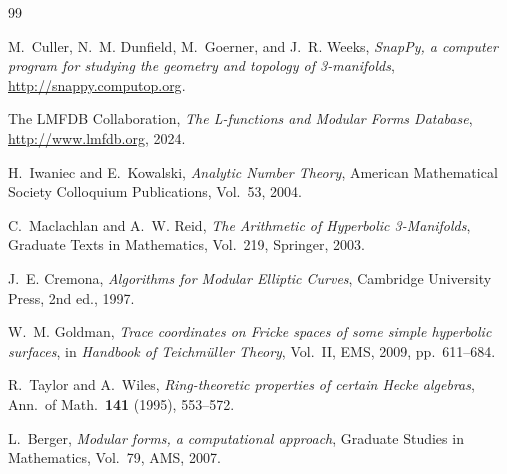 \documentclass{amsart}
\theoremstyle{definition}
\theoremstyle{remark}
\begin{document}
\begin{thebibliography}{99}

M.~Culler, N.~M. Dunfield, M.~Goerner, and J.~R. Weeks,
\textit{SnapPy, a computer program for studying the geometry and topology
of 3-manifolds}, \url{http://snappy.computop.org}.

The LMFDB Collaboration,
\textit{The L-functions and Modular Forms Database},
\url{http://www.lmfdb.org}, 2024.

H.~Iwaniec and E.~Kowalski,
\textit{Analytic Number Theory},
American Mathematical Society Colloquium Publications, Vol.~53, 2004.

C.~Maclachlan and A.~W. Reid,
\textit{The Arithmetic of Hyperbolic 3-Manifolds},
Graduate Texts in Mathematics, Vol.~219, Springer, 2003.

J.~E. Cremona,
\textit{Algorithms for Modular Elliptic Curves},
Cambridge University Press, 2nd ed., 1997.

W.~M. Goldman,
\textit{Trace coordinates on Fricke spaces of some simple hyperbolic surfaces},
in \textit{Handbook of Teichmüller Theory}, Vol.~II, EMS, 2009, pp.~611--684.

R.~Taylor and A.~Wiles,
\textit{Ring-theoretic properties of certain Hecke algebras},
Ann.\ of Math.\ \textbf{141} (1995), 553--572.

L.~Berger,
\textit{Modular forms, a computational approach},
Graduate Studies in Mathematics, Vol.~79, AMS, 2007.

\end{thebibliography}
\end{document}
